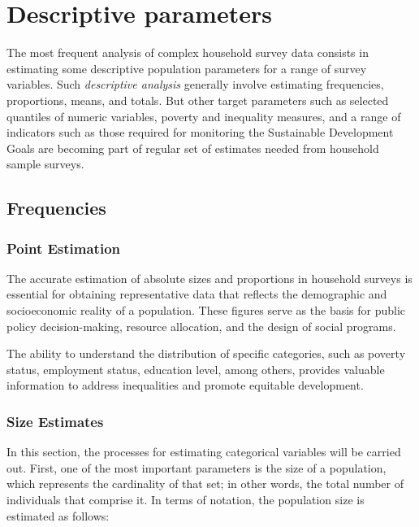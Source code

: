 \documentclass[
  12pt,
]{book}
\begin{document}
\hypertarget{descriptive-parameters}{%
\chapter{Descriptive parameters}\label{descriptive-parameters}}

The most frequent analysis of complex household survey data consists in estimating some descriptive population parameters for a range of survey variables. Such \emph{descriptive analysis} generally involve estimating frequencies, proportions, means, and totals. But other target parameters such as selected quantiles of numeric variables, poverty and inequality measures, and a range of indicators such as those required for monitoring the Sustainable Development Goals are becoming part of regular set of estimates needed from household sample surveys.

\hypertarget{frequencies}{%
\section{Frequencies}\label{frequencies}}

\hypertarget{point-estimation}{%
\subsection{Point Estimation}\label{point-estimation}}

The accurate estimation of absolute sizes and proportions in household surveys is essential for obtaining representative data that reflects the demographic and socioeconomic reality of a population. These figures serve as the basis for public policy decision-making, resource allocation, and the design of social programs.

The ability to understand the distribution of specific categories, such as poverty status, employment status, education level, among others, provides valuable information to address inequalities and promote equitable development.

\hypertarget{size-estimates}{%
\subsection{Size Estimates}\label{size-estimates}}

In this section, the processes for estimating categorical variables will be carried out. First, one of the most important parameters is the size of a population, which represents the cardinality of that set; in other words, the total number of individuals that comprise it. In terms of notation, the population size is estimated as follows:
\end{document}

